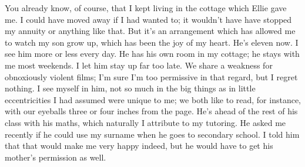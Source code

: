 You already know, of course, that I kept living in the cottage which Ellie gave me. I could have moved away if I had wanted to; it wouldn't have have stopped my annuity or anything like that. But it's an arrangement which has allowed me to watch my son grow up, which has been the joy of my heart. He's eleven now. I see him more or less every day. He has his own room in my cottage; he stays with me most weekends. I let him stay up far too late. We share a weakness for obnoxiously violent films; I'm sure I'm too permissive in that regard, but I regret nothing. I see myself in him, not so much in the big things as in little eccentricities I had assumed were unique to me; we both like to read, for instance, with our eyeballs three or four inches from the page. He's ahead of the rest of his class with his maths, which naturally I attribute to my tutoring. He asked me recently if he could use my surname when he goes to secondary school. I told him that that would make me very happy indeed, but he would have to get his mother's permission as well.
